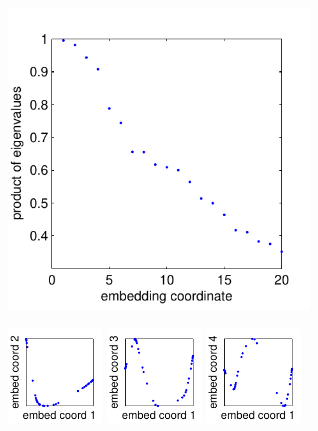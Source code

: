 \documentclass[10pt]{article}
\begin{document}
\includegraphics[width=8cm]{drosophila_live_eval_spectrum}

\includegraphics[width=2.5cm]{drosophila_live_evec_corr1}
\includegraphics[width=2.5cm]{drosophila_live_evec_corr2}
\includegraphics[width=2.5cm]{drosophila_live_evec_corr3}
\end{document}
